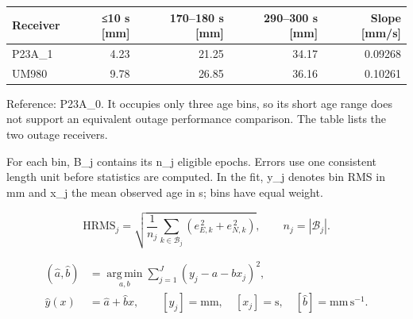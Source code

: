 \documentclass[11pt,a4paper]{article}
\numberwithin{equation}{section}
\numberwithin{figure}{section}
\begin{document}
\begin{center}\begin{lrbox}{\reporttable}\small\setlength{\tabcolsep}{4pt}\begin{tabular}{lrrrr}\toprule
Receiver & ≤10 s [mm] & 170–180 s [mm] & 290–300 s [mm] & Slope [mm/\allowbreak{}s]\\\midrule
P23A\_1 & 4.23 & 21.25 & 34.17 & 0.09268\\
UM980 & 9.78 & 26.85 & 36.16 & 0.10261\\
\bottomrule\end{tabular}\end{lrbox}\ifdim\wd\reporttable>\linewidth\resizebox{\linewidth}{!}{\usebox{\reporttable}}\else\usebox{\reporttable}\fi\end{center}

Reference: P23A\_0. It occupies only three age bins, so its short age range does not support an equivalent outage performance comparison. The table lists the two outage receivers.

For each bin, B\_j contains its n\_j eligible epochs. Errors use one consistent length unit before statistics are computed. In the fit, y\_j denotes bin RMS in mm and x\_j the mean observed age in s; bins have equal weight.

\begin{equation}\mathrm{HRMS}_j=\sqrt{\frac{1}{n_j}\sum_{k\in\mathcal B_j}\left(e_{E,k}^{\,2}+e_{N,k}^{\,2}\right)},\qquad n_j=|\mathcal B_j|.\label{eq:en-hrms}\end{equation}

\begin{equation}\begin{aligned}(\hat a,\hat b)&=\underset{a,b}{\operatorname{arg\,min}}\sum_{j=1}^{J}(y_j-a-bx_j)^2,\\ \hat y(x)&=\hat a+\hat b x,\qquad [y_j]=\mathrm{mm},\quad [x_j]=\mathrm{s},\quad [\hat b]=\mathrm{mm\,s^{-1}}.\end{aligned}\label{eq:en-fit}\end{equation}
\end{document}
